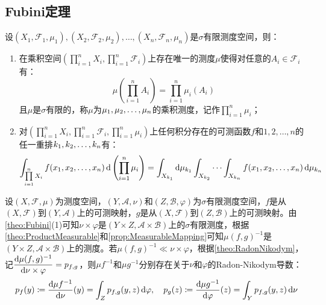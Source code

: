 \subsection{Fubini定理}
\begin{theorem}\label{theo:Fubini}
	设$(X_1,\mathscr{F}_1,\mu_1),(X_2,\mathscr{F}_2,\mu_2),\dots,(X_n,\mathscr{F}_n,\mu_n)$是$\sigma$有限测度空间，则：
	\begin{enumerate}
		\item 在乘积空间$\left(\prod\limits_{i=1}^{n}X_i,\prod\limits_{i=1}^{n}\mathscr{F}_i\right)$上存在唯一的测度$\mu$使得对任意的$A_i\in\mathscr{F}_i$有：
		\begin{equation*}
			\mu\left(\prod_{i=1}^{n}A_i\right)=\prod_{i=1}^{n}\mu_i(A_i)
		\end{equation*}
		且$\mu$是$\sigma$有限的，称$\mu$为$\mu_1, \mu_2, \dots, \mu_{n}$的乘积测度，记作$\prod\limits_{i=1}^{n}\mu_i$；
		\item 对$\left(\prod\limits_{i=1}^{n}X_i,\prod\limits_{i=1}^{n}\mathscr{F}_i,\prod\limits_{i=1}^{n}\mu_i\right)$上任何积分存在的可测函数$f$和$1,2,\dots,n$的任一重排$k_1, k_2, \dots, k_{n}$有：
		\begin{equation*}
			\int_{\prod\limits_{i=1}^{n}X_i}f(x_1, x_2, \dots, x_{n})\mathop{}\!\mathrm{d}\left(\prod_{i=1}^{n}\mu_i\right)=\int_{X_{k_1}}\mathop{}\!\mathrm{d}\mu_{k_1}\int_{X_{k_2}}\cdots\int_{X_{k_n}}f(x_1, x_2, \dots, x_{n})\mathop{}\!\mathrm{d}\mu_{k_n}
		\end{equation*}
	\end{enumerate}
\end{theorem}
\begin{theorem}\label{theo:MarginalDensity}
	设$(X,\mathscr{F},\mu)$为测度空间，$(Y,\mathscr{A},\nu)$和$(Z,\mathscr{B},\varphi)$为$\sigma$有限测度空间，$f$是从$(X,\mathscr{F})$到$(Y,\mathscr{A})$上的可测映射，$g$是从$(X,\mathscr{F})$到$(Z,\mathscr{B})$上的可测映射。由\cref{theo:Fubini}(1)可知$\nu\times\varphi$是$(Y\times Z,\mathscr{A}\times\mathscr{B})$上的$\sigma$有限测度，根据\cref{theo:ProductMeasurable}和\cref{prop:MeasurableMapping}可知$\mu(f,g)^{-1}$是$(Y\times Z,\mathscr{A}\times\mathscr{B})$上的测度。若$\mu(f,g)^{-1}\ll\nu\times\varphi$，根据\cref{theo:RadonNikodym}，记$\dfrac{\mathop{}\!\mathrm{d}\mu(f,g)^{-1}}{\mathop{}\!\mathrm{d}\nu\times\varphi}=p_{f,g}$，则$\mu f^{-1}$和$\mu g^{-1}$分别存在关于$\nu$和$\varphi$的Radon-Nikodym导数：
	\begin{equation*}
		p_f(y)\coloneq\dfrac{\mathop{}\!\mathrm{d}\mu f^{-1}}{\mathop{}\!\mathrm{d}\nu}(y)=\int_{Z}p_{f,g}(y,z)\mathop{}\!\mathrm{d}\varphi,\quad p_g(z)\coloneq\dfrac{\mathop{}\!\mathrm{d}\mu g^{-1}}{\mathop{}\!\mathrm{d}\varphi}(z)=\int_{Y}p_{f,g}(y,z)\mathop{}\!\mathrm{d}\nu
	\end{equation*}
\end{theorem}

